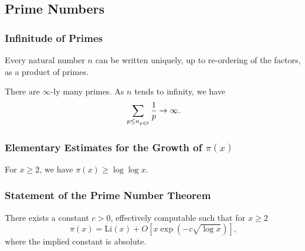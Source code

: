 \subsection{Prime Numbers}

\subsubsection{Infinitude of Primes}
\begin{theorem}
    Every natural number \(n\) can be written uniquely, up to re-ordering of the factors, as a product of primes.
\end{theorem}

\begin{theorem}[Euclid]
    There are \(\infty\)-ly many primes. As \(n\) tends to infinity, we have
    \[\sum_{{p \leq n}_{p \in \mathbb{P}}} \frac{1}{p} \to \infty.\]
\end{theorem}

\subsubsection{Elementary Estimates for the Growth of \(\pi(x)\)}

\begin{theorem}[Gauss]
    For \(x \geq 2\), we have \(\pi(x) \geq \log\log x\).
\end{theorem}

\subsubsection{Statement of the Prime Number Theorem}
\begin{theorem}
    There exists a constant \(c > 0\), effectively computable such that for \(x \geq 2\)
    \[\pi(x) = \mathrm{Li}(x) + O\left[x \exp(-c \sqrt{\log x})\right],\]
    where the implied constant is absolute.
\end{theorem}